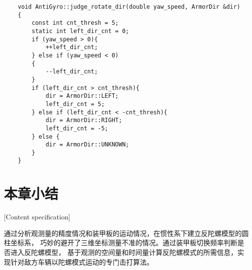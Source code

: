 \begin{lstlisting}
    void AntiGyro::judge_rotate_dir(double yaw_speed, ArmorDir &dir)
    {
        const int cnt_thresh = 5;
        static int left_dir_cnt = 0;
        if (yaw_speed > 0){
            ++left_dir_cnt;
        } else if (yaw_speed < 0)
        {
            --left_dir_cnt;
        } 
        if (left_dir_cnt > cnt_thresh){
            dir = ArmorDir::LEFT;
            left_dir_cnt = 5;
        } else if (left_dir_cnt < -cnt_thresh){    
            dir = ArmorDir::RIGHT;
            left_dir_cnt = -5;
        } else {
            dir = ArmorDir::UNKNOWN;
        }
    }
\end{lstlisting}


\section{本章小结}[Content specification]

通过分析观测量的精度情况和装甲板的运动情况，在惯性系下建立反陀螺模型的圆柱坐标系，
巧妙的避开了三维坐标测量不准的情况。通过装甲板切换频率判断是否进入反陀螺模型，
基于观测的空间量和时间量计算反陀螺模式的所需信息，实现针对敌方车辆以陀螺模式运动的专门击打算法。
